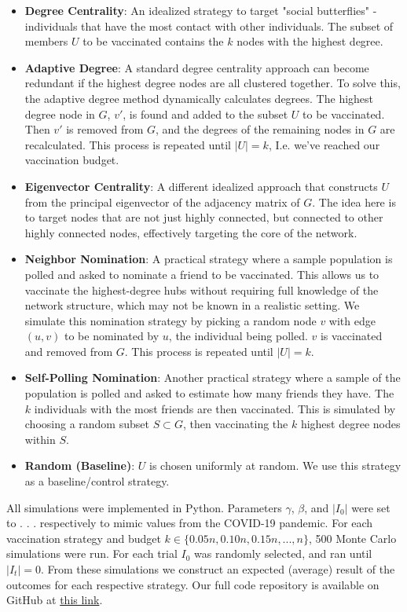\documentclass[9pt,twocolumn,twoside]{pnas-new}
\begin{document}
\begin{itemize}
    \item \textbf{Degree Centrality}: An idealized strategy to target "social butterflies" - individuals that have the most contact with other individuals. The subset of members $U$ to be vaccinated contains the $k$ nodes with the highest degree.
    \item \textbf{Adaptive Degree}: A standard degree centrality approach can become redundant if the highest degree nodes are all clustered together. To solve this, the adaptive degree method dynamically calculates degrees. The highest degree node in $G$, $v'$, is found and added to the subset $U$ to be vaccinated. Then $v'$ is removed from $G$, and the degrees of the remaining nodes in $G$ are recalculated. This process is repeated until $|U|=k$, I.e. we've reached our vaccination budget.
    \item \textbf{Eigenvector Centrality}: A different idealized approach that constructs $U$ from the principal eigenvector of the adjacency matrix of $G$. The idea here is to target nodes that are not just highly connected, but connected to other highly connected nodes, effectively targeting the core of the network.
    \item \textbf{Neighbor Nomination}: A practical strategy where a sample population is polled and asked to nominate a friend to be vaccinated. This allows us to vaccinate the highest-degree hubs without requiring full knowledge of the network structure, which may not be known in a realistic setting. We simulate this nomination strategy by picking a random node $v$ with edge $(u,v)$ to be nominated by $u$, the individual being polled. $v$ is vaccinated and removed from $G$. This process is repeated until $|U|=k$.
    \item \textbf{Self-Polling Nomination}: Another practical strategy where a sample of the population is polled and asked to estimate how many friends they have. The $k$ individuals with the most friends are then vaccinated. This is simulated by choosing a random subset $S\subset G$, then vaccinating the $k$ highest degree nodes within $S$.
    \item \textbf{Random (Baseline)}: $U$ is chosen uniformly at random. We use this strategy as a baseline/control strategy.
\end{itemize}
All simulations were implemented in Python. Parameters $\gamma$, $\beta$, and $|I_0|$ were set to . . . respectively to mimic values from the COVID-19 pandemic. For each vaccination strategy and budget $k\in\{0.05n, 0.10n, 0.15n, ..., n\}$, 500 Monte Carlo simulations were run. For each trial $I_0$ was randomly selected, and ran until $|I_t| = 0$. From these simulations we construct an expected (average) result of the outcomes for each respective strategy. Our full code repository is available on GitHub at \href{https://github.com/jonjon-levi/disease-propogation-network}{this link}. 
\end{document}
